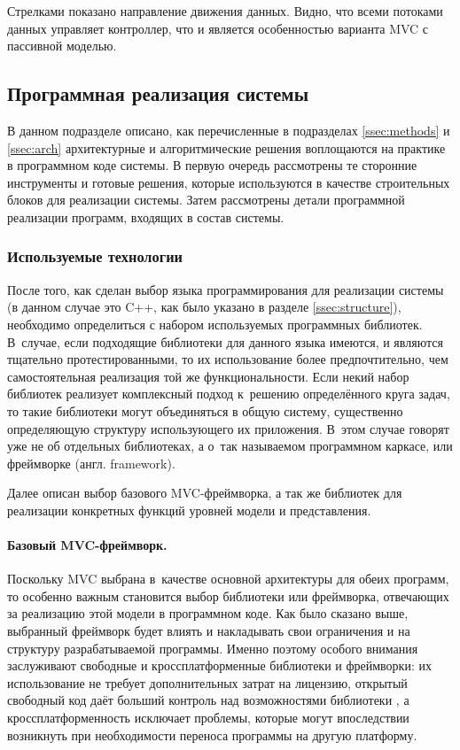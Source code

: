 \documentclass[a4paper, 14pt, titlepage]{extarticle}
\newcommand{\eng}[1]{\foreignlanguage{english}{#1}}
\begin{document}
  Стрелками
  показано направление движения данных. Видно, что всеми потоками данных управляет контроллер, что и
  является особенностью варианта MVC с пассивной моделью.

  \subsection{Программная реализация системы}

  В данном подразделе описано, как перечисленные в подразделах \ref{ssec:methods} и \ref{ssec:arch}
  архитектурные и алгоритмические решения воплощаются на практике в программном коде системы.
  В первую очередь рассмотрены те сторонние инструменты и готовые решения, которые используются в
  качестве строительных блоков для реализации системы. Затем рассмотрены детали программной
  реализации программ, входящих в состав системы.

  \subsubsection{Используемые технологии}\label{sssec:techno}

  После того, как сделан выбор языка программирования для реализации системы (в данном случае это
  C++, как было указано в разделе \ref{ssec:structure}), необходимо определиться с набором используемых
  программных библиотек. В~случае, если подходящие библиотеки для данного языка имеются, и являются тщательно
  протестированными, то их использование более предпочтительно, чем самостоятельная реализация той
  же функциональности. Если некий набор библиотек реализует комплексный подход к~решению
  определённого круга задач, то такие библиотеки могут объединяться в общую систему, существенно
  определяющую структуру использующего их приложения. В~этом случае говорят уже не об отдельных
  библиотеках, а о~так называемом программном каркасе, или фреймворке (англ. \eng{framework}).

  Далее описан выбор базового MVC-фреймворка, а так же библиотек для реализации
  конкретных функций уровней модели и представления.

  \paragraph{Базовый MVC-фреймворк.}
  Поскольку MVC выбрана в~качестве основной архитектуры для обеих программ, то особенно важным
  становится выбор библиотеки или фреймворка, отвечающих за реализацию этой модели в программном
  коде. Как было сказано выше, выбранный фреймворк будет влиять и накладывать свои ограничения и на
  структуру разрабатываемой программы. Именно поэтому особого внимания заслуживают свободные и
  кроссплатформенные библиотеки и фреймворки: их использование не требует дополнительных затрат на
  лицензию, открытый свободный код даёт больший контроль над возможностями библиотеки \cite{open-source},
  а кроссплатформенность исключает проблемы, которые могут впоследствии возникнуть при необходимости
  переноса программы на другую платформу.
\end{document}
